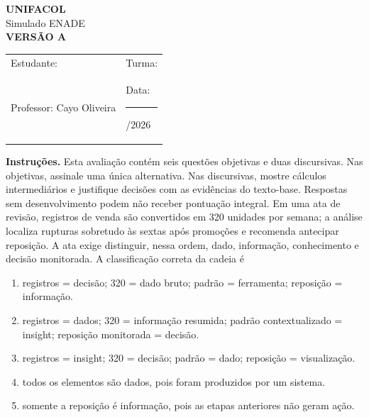 \documentclass[12pt,a4paper]{article}
\begin{document}
\begin{center}
{\Large\bfseries UNIFACOL}\\[2mm]
{\large Simulado ENADE}\\[1mm]
{\Large\bfseries VERSÃO A}
\end{center}
\begin{DocumentBox}[Identificação]
\begin{tabularx}{\textwidth}{@{}p{}p{}@{}}
Estudante: \hrulefill & Turma: \hrulefill\\[3mm]
Professor: Cayo Oliveira & Data: \rule{2.7cm}{.2pt}/2026
\end{tabularx}
\end{DocumentBox}
\textbf{Instruções.} Esta avaliação contém seis questões objetivas e duas discursivas. Nas objetivas, assinale uma única alternativa. Nas discursivas, mostre cálculos intermediários e justifique decisões com as evidências do texto-base. Respostas sem desenvolvimento podem não receber pontuação integral.
\bigskip
\TextoBase Em uma ata de revisão, registros de venda são convertidos em 320 unidades por semana; a análise localiza rupturas sobretudo às sextas após promoções e recomenda antecipar reposição. A ata exige distinguir, nessa ordem, dado, informação, conhecimento e decisão monitorada.
\FonteDidatica
\Comando A classificação correta da cadeia é
\begin{enumerate}[label=\Alph*)]
  \item registros = decisão; 320 = dado bruto; padrão = ferramenta; reposição = informação.
  \item registros = dados; 320 = informação resumida; padrão contextualizado = insight; reposição monitorada = decisão.
  \item registros = insight; 320 = decisão; padrão = dado; reposição = visualização.
  \item todos os elementos são dados, pois foram produzidos por um sistema.
  \item somente a reposição é informação, pois as etapas anteriores não geram ação.
\end{enumerate}
\end{document}
